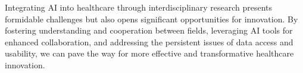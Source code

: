 Integrating AI into healthcare through interdisciplinary research presents formidable challenges but also opens significant opportunities for innovation. By fostering understanding and cooperation between fields, leveraging AI tools for enhanced collaboration, and addressing the persistent issues of data access and usability, we can pave the way for more effective and transformative healthcare innovation.




